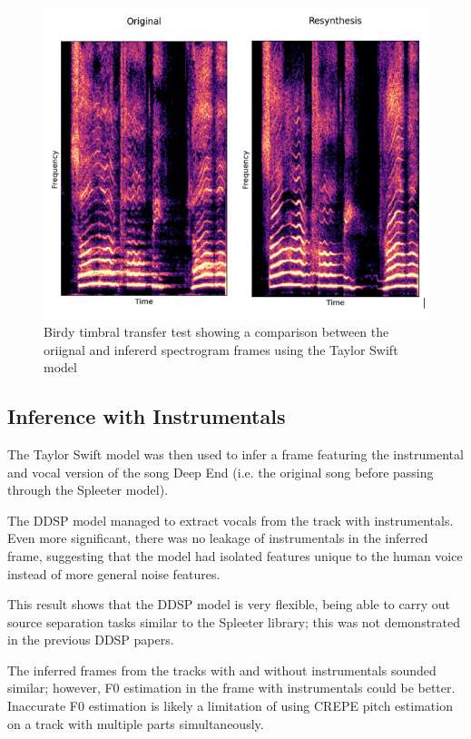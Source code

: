 \begin{figure}[H]
    \centering
    \includegraphics[width=\textwidth]{research/results/Birdy/TimbralTransfer.png}
    \caption{Birdy timbral transfer test showing a comparison between the oriignal and infererd spectrogram frames using the Taylor Swift model}
\end{figure}

\subsection{Inference with Instrumentals}

The Taylor Swift model was then used to infer a frame featuring the instrumental and vocal version of the song Deep End (i.e. the original song before passing through the Spleeter model).

The DDSP model managed to extract vocals from the track with instrumentals. Even more significant, there was no leakage of instrumentals in the inferred frame, suggesting that the model had isolated features unique to the human voice instead of more general noise features.

This result shows that the DDSP model is very flexible, being able to carry out source separation tasks similar to the Spleeter library\cite{Spleeter}; this was not demonstrated in the previous DDSP papers.

The inferred frames from the tracks with and without instrumentals sounded similar; however, F0 estimation in the frame with instrumentals could be better. Inaccurate F0 estimation is likely a limitation of using CREPE pitch estimation on a track with multiple parts simultaneously.

